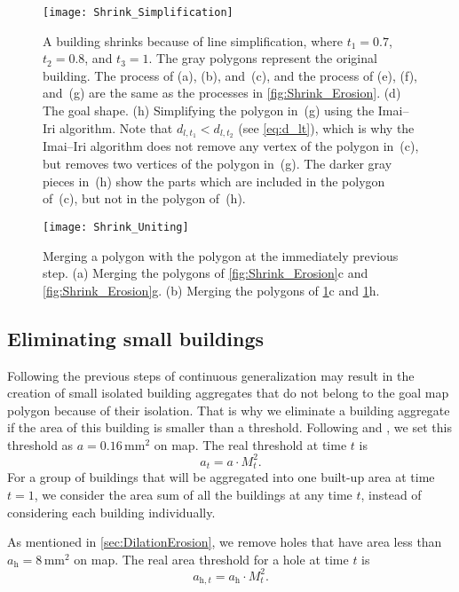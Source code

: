 \begin{figure}[tb]
	\centering
	\texttt{[image: Shrink\_Simplification]}
	\caption{A building shrinks because of line simplification, 
		where $t_1=0.7$, $t_2=0.8$, and $t_3=1$.
		The gray polygons represent the original building.
		The process of (a), (b), and~(c), and 
		the process of (e), (f), and~(g) are the same as 
		the processes in \fig\ref{fig:Shrink_Erosion}.
		(d) The goal shape.
		(h) Simplifying the polygon in~(g) using the Imai--Iri algorithm.
		Note that $d_{l,t_1}<d_{l,t_2}$ (see \eq\ref{eq:d_lt}),
		which is why the Imai--Iri algorithm does not 
		remove any vertex of the polygon in~(c),
		but removes two vertices of the polygon in~(g).
		The darker gray pieces in~(h) show 
		the parts which are included in the polygon of~(c), 
		but not in the polygon of~(h).
	}
	\label{fig:Shrink_Simplification}
\end{figure}

\begin{figure}[tb]
	\centering
	\texttt{[image: Shrink\_Uniting]}
	\caption{Merging a polygon with the polygon at the immediately previous 
		step.
		(a) Merging the polygons of \fig\ref{fig:Shrink_Erosion}c and 
		\fig\ref{fig:Shrink_Erosion}g.
		(b) Merging the polygons of \fig\ref{fig:Shrink_Simplification}c and 
		\fig\ref{fig:Shrink_Simplification}h.
	}
	\label{fig:Shrink_Uniting}
\end{figure}




\subsection{Eliminating small buildings}
\label{sec:Eliminate}
Following the previous steps of continuous generalization may result in the 
creation of small isolated building aggregates that do not belong to the goal 
map polygon because of their isolation.
That is why we eliminate a building aggregate if the area of this building is 
smaller than a threshold.
Following \citet{Stoter2009} and \citet{Chaudhry2008}, 
we set this threshold as $a=0.16\,\mathrm{mm}^2$ on map.
The real threshold at time $t$ is
\[
a_t=a\cdot M_t^2.
\]
For a group of buildings that will be aggregated into one built-up area at time 
$t=1$, we consider the area sum of all the buildings at any time $t$, 
instead of considering each building individually.

As mentioned in \sect\ref{sec:DilationErosion}, 
we remove holes that have area less than 
$a_\mathrm{h} = 8\,\mathrm{mm}^2$ on map.
The real area threshold for a hole at time $t$ is
\[
a_{\mathrm{h},t}=a_\mathrm{h}\cdot M_t^2.
\]

